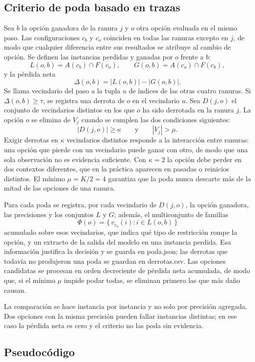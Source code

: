 \documentclass[12pt,letterpaper]{article}
\theoremstyle{definition}
\begin{document}
\subsection{Criterio de poda basado en trazas}\label{sec:poda}
Sea $b$ la opción ganadora de la ranura $j$ y $o$ otra opción evaluada en el mismo paso. Las configuraciones $c_b$ y $c_o$ coinciden en todas las ranuras excepto en $j$, de modo que cualquier diferencia entre sus resultados se atribuye al cambio de opción. Se definen las instancias perdidas y ganadas por $o$ frente a $b$:
\[
L(o,b) = A(c_b) \cap F(c_o), \qquad G(o,b) = A(c_o) \cap F(c_b),
\]
y la pérdida neta
\[
\Delta(o,b) = |L(o,b)| - |G(o,b)|.
\]
Se llama vecindario del paso a la tupla $u$ de índices de las otras cuatro ranuras. Si $\Delta(o,b) \geq \tau$, se registra una derrota de $o$ en el vecindario $u$. Sea $D(j,o)$ el conjunto de vecindarios distintos en los que $o$ ha sido derrotada en la ranura $j$. La opción $o$ se elimina de $V_j$ cuando se cumplen las dos condiciones siguientes:
\[
|D(j,o)| \geq \kappa \qquad \text{y} \qquad |V_j| > \mu.
\]
Exigir derrotas en $\kappa$ vecindarios distintos responde a la interacción entre ranuras: una opción que pierde con un vecindario puede ganar con otro, de modo que una sola observación no es evidencia suficiente. Con $\kappa = 2$ la opción debe perder en dos contextos diferentes, que en la práctica aparecen en pasadas o reinicios distintos. El mínimo $\mu = K/2 = 4$ garantiza que la poda nunca descarte más de la mitad de las opciones de una ranura.

Para cada poda se registra, por cada vecindario de $D(j,o)$, la opción ganadora, las precisiones y los conjuntos $L$ y $G$; además, el multiconjunto de familias
\[
\Phi(o) = \{\, v_{c_o}(i) : i \in L(o,b) \,\}
\]
acumulado sobre esos vecindarios, que indica qué tipo de restricción rompe la opción, y un extracto de la salida del modelo en una instancia perdida. Esa información justifica la decisión y se guarda en poda.json; las derrotas que todavía no produjeron una poda se guardan en derrotas.csv. Las opciones candidatas se procesan en orden decreciente de pérdida neta acumulada, de modo que, si el mínimo $\mu$ impide podar todas, se eliminan primero las que más daño causan.

La comparación se hace instancia por instancia y no solo por precisión agregada. Dos opciones con la misma precisión pueden fallar instancias distintas; en ese caso la pérdida neta es cero y el criterio no las poda sin evidencia.

\subsection{Pseudocódigo}
\end{document}

